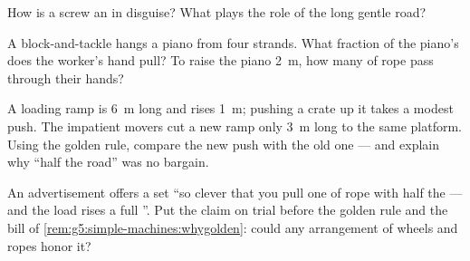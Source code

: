 \begin{exercise}[$\star$]\label{exo:g5:simple-machines:8}
How is a screw an  in disguise? What plays the role
of the long gentle road?
\end{exercise}

\begin{exercise}[$\star\star$]\label{exo:g5:simple-machines:9}
A block-and-tackle hangs a piano from four strands. What fraction
of the piano's  does the worker's hand pull? To raise the
piano \qty{2}{m}, how many  of rope pass through their
hands?
\end{exercise}

\begin{exercise}[$\star\star$]\label{exo:g5:simple-machines:10}
A loading ramp is \qty{6}{m} long and rises \qty{1}{m}; pushing a
crate up it takes a modest push. The impatient movers cut a new
ramp only \qty{3}{m} long to the same platform. Using the golden
rule, compare the new push with the old one --- and explain why
``half the road'' was no bargain.
\end{exercise}

\begin{exercise}[$\star\star$]\label{exo:g5:simple-machines:11}
An advertisement offers a  set ``so clever that you pull one
 of rope with half the  --- and the load rises a full
''. Put the claim on trial before the golden rule and the
 bill of \cref{rem:g5:simple-machines:whygolden}: could any
arrangement of wheels and ropes honor it?
\end{exercise}
